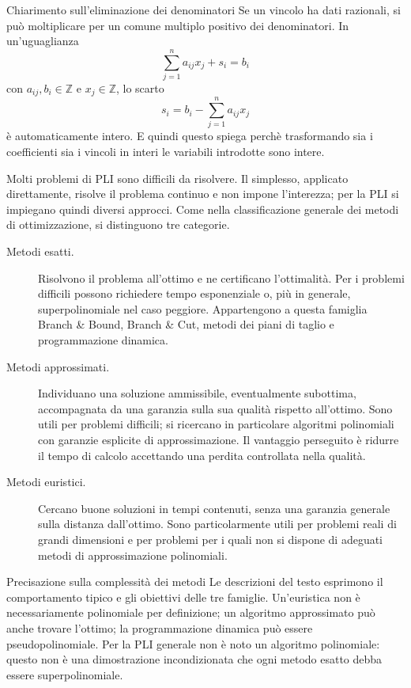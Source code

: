 \begin{remark}{Chiarimento sull'eliminazione dei denominatori}
Se un vincolo ha dati razionali, si può moltiplicare per un comune
multiplo positivo dei denominatori. In un'uguaglianza
\[
\sum_{j=1}^n a_{ij}x_j+s_i=b_i
\]
con \(a_{ij},b_i\in\mathbb Z\) e \(x_j\in\mathbb Z\), lo scarto
\[
s_i=b_i-\sum_{j=1}^n a_{ij}x_j
\]
è automaticamente intero. E quindi questo spiega perchè trasformando sia i coefficienti sia i vincoli in interi le variabili introdotte sono intere.
\end{remark}

Molti problemi di PLI sono difficili da risolvere. Il simplesso,
applicato direttamente, risolve il problema continuo e non impone
l'interezza; per la PLI si impiegano quindi diversi approcci.
Come nella classificazione generale dei metodi di ottimizzazione,
si distinguono tre categorie.

\begin{description}
\item[Metodi esatti.]
Risolvono il problema all'ottimo e ne certificano l'ottimalità.
Per i problemi difficili possono richiedere tempo esponenziale
o, più in generale, superpolinomiale nel caso peggiore.
Appartengono a questa famiglia Branch \& Bound, Branch \& Cut,
metodi dei piani di taglio e programmazione dinamica.

\item[Metodi approssimati.]
Individuano una soluzione ammissibile, eventualmente subottima,
accompagnata da una garanzia sulla sua qualità rispetto all'ottimo.
Sono utili per problemi difficili; si ricercano in particolare
algoritmi polinomiali con garanzie esplicite di approssimazione.
Il vantaggio perseguito è ridurre il tempo di calcolo accettando
una perdita controllata nella qualità.

\item[Metodi euristici.]
Cercano buone soluzioni in tempi contenuti, senza una garanzia generale
sulla distanza dall'ottimo. Sono particolarmente utili per problemi
reali di grandi dimensioni e per problemi per i quali non si dispone
di adeguati metodi di approssimazione polinomiali.
\end{description}

\begin{remark}{Precisazione sulla complessità dei metodi}
Le descrizioni del testo esprimono il comportamento tipico e gli
obiettivi delle tre famiglie. Un'euristica non è necessariamente
polinomiale per definizione; un algoritmo approssimato può anche
trovare l'ottimo; la programmazione dinamica può essere
pseudopolinomiale. Per la PLI generale non è noto un algoritmo
polinomiale: questo non è una dimostrazione incondizionata
che ogni metodo esatto debba essere superpolinomiale.
\end{remark}


